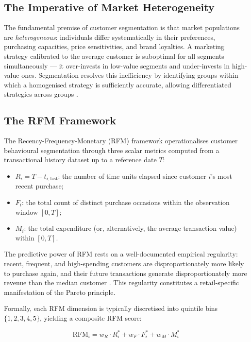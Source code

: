 \subsection{The Imperative of Market Heterogeneity}

The fundamental premise of customer segmentation is that market populations are \textit{heterogeneous}: individuals differ systematically in their preferences, purchasing capacities, price sensitivities, and brand loyalties. A marketing strategy calibrated to the average customer is suboptimal for all segments simultaneously — it over-invests in low-value segments and under-invests in high-value ones. Segmentation resolves this inefficiency by identifying groups within which a homogenised strategy is sufficiently accurate, allowing differentiated strategies across groups \cite{james2013introduction}.

\subsection{The RFM Framework}

The Recency-Frequency-Monetary (RFM) framework operationalises customer behavioural segmentation through three scalar metrics computed from a transactional history dataset up to a reference date $T$:

\begin{itemize}[noitemsep]
    \item $R_i = T - t_{i,\text{last}}$: the number of time units elapsed since customer $i$'s most recent purchase;
    \item $F_i$: the total count of distinct purchase occasions within the observation window $[0, T]$;
    \item $M_i$: the total expenditure (or, alternatively, the average transaction value) within $[0, T]$.
\end{itemize}

The predictive power of RFM rests on a well-documented empirical regularity: recent, frequent, and high-spending customers are disproportionately more likely to purchase again, and their future transactions generate disproportionately more revenue than the median customer \cite{Hughes1996}. This regularity constitutes a retail-specific manifestation of the Pareto principle.

Formally, each RFM dimension is typically discretised into quintile bins $\{1, 2, 3, 4, 5\}$, yielding a composite RFM score:

\begin{equation}
    \text{RFM}_i = w_R \cdot R_i^* + w_F \cdot F_i^* + w_M \cdot M_i^*
    \label{eq:rfm_score}
\end{equation}

